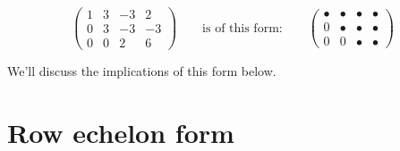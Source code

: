\documentclass{ximera}
\begin{document}
\[
\begin{pmatrix}
  1 &   3 & -3 & 2  \\
  0 &   3 & -3 & -3 \\
  0& 0  & 2 & 6
\end{pmatrix}
\qquad
\text{is of this form:}
\qquad
\begin{pmatrix}
  \bullet & \bullet & \bullet & \bullet \\
     0   & \bullet & \bullet & \bullet \\
     0  &    0 & \bullet & \bullet 
\end{pmatrix}
\]



We'll discuss the implications of this form below.


\section{Row echelon form}
\end{document}
